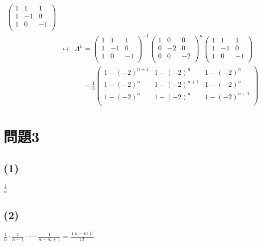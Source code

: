 \documentclass[]{jsarticle}
\begin{document}
\begin{eqnarray}
\begin{pmatrix}
                1 & 1 & 1 \\
                1 & -1 & 0 \\
                1 & 0 & -1 \\
            \end{pmatrix} \nonumber \\
            &\leftrightarrow& A^n = \begin{pmatrix}
                1 & 1 & 1 \\
                1 & -1 & 0 \\
                1 & 0 & -1 \\
            \end{pmatrix}^{-1}
            \begin{pmatrix}
                1 & 0 & 0 \\
                0 & -2 & 0 \\
                0 & 0 & -2 \\
            \end{pmatrix}^n
            \begin{pmatrix}
                1 & 1 & 1 \\
                1 & -1 & 0 \\
                1 & 0 & -1 \\
            \end{pmatrix} \nonumber \\
            && \ \ \ \ \ = \frac{1}{3}\begin{pmatrix}
                1 - (-2)^{n + 1} & 1 - (-2)^n & 1 - (-2)^n \\
                1 - (-2)^n & 1 - (-2)^{n + 1} & 1 - (-2)^n \\
                1 - (-2)^n & 1 - (-2)^n & 1 - (-2)^{n + 1} \\
            \end{pmatrix} \nonumber
        \end{eqnarray}
\section*{問題3}
    \subsection*{(1)}
        $\displaystyle\frac{1}{n}$
    \subsection*{(2)}
        $\displaystyle\frac{1}{n}\cdot\frac{1}{n - 1}\cdot\cdots\cdot\frac{1}{n - m + 1} = \frac{(n - m)!}{n!}$
\end{document}
